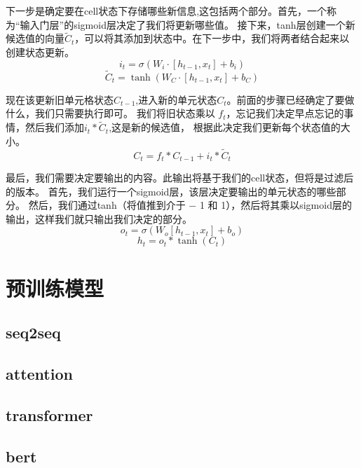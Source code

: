   下一步是确定要在cell状态下存储哪些新信息,这包括两个部分。首先，一个称为“输入门层”的sigmoid层决定了我们将更新哪些值。
  接下来，tanh层创建一个新候选值的向量$\tilde{C}_{t}$，可以将其添加到状态中。在下一步中，我们将两者结合起来以创建状态更新。
  \begin{equation}
    i_{t} =\sigma\left(W_{i} \cdot\left[h_{t-1}, x_{t}\right]+b_{i}\right) 
  \end{equation}  
    \begin{equation}
      \tilde{C}_{t} =\tanh \left(W_{C} \cdot\left[h_{t-1}, x_{t}\right]+b_{C}\right)
      \end{equation}   

现在该更新旧单元格状态$C_{t-1}$,进入新的单元状态$C_{t}$。前面的步骤已经确定了要做什么，我们只需要执行即可。
我们将旧状态乘以 $f_{t}$，忘记我们决定早点忘记的事情，然后我们添加$i_{t} * \tilde{C}_{t}$,这是新的候选值，
根据此决定我们更新每个状态值的大小。
\begin{equation}
C_{t}=f_{t} * C_{t-1}+i_{t} * \tilde{C}_{t}
\end{equation} 

最后，我们需要决定要输出的内容。此输出将基于我们的cell状态，但将是过滤后的版本。
首先，我们运行一个sigmoid层，该层决定要输出的单元状态的哪些部分。
然后，我们通过tanh（将值推到介于 − 1 和 1），然后将其乘以sigmoid层的输出，这样我们就只输出我们决定的部分。
\begin{equation}
  o_{t}=\sigma\left(W_{o}\left[h_{t-1}, x_{t}\right]+b_{o}\right)
\end{equation} 
\begin{equation}
  h_{t}=o_{t} * \tanh \left(C_{t}\right)
\end{equation}



\section{预训练模型}
\subsection{seq2seq}
\subsection{attention}
\subsection{transformer}
\subsection{bert}